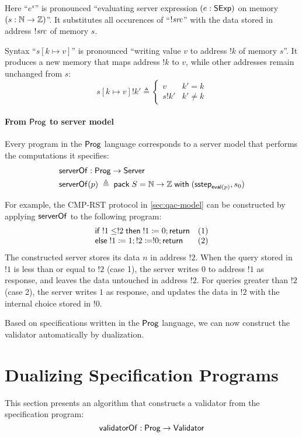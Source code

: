 Here ``$e^s$'' is pronounced ``evaluating server expression $(e:\mathsf{SExp})$ on
memory $(s:\mathbb N\to\mathbb Z)$''.  It substitutes all occurences of ``$!\mathit{src}$'' with
the data stored in address $!\mathit{src}$ of memory $s$.

Syntax ``$s[k\mapsto v]$'' is pronounced ``writing value $v$ to address $!k$ of
memory $s$''.  It produces a new memory that maps address $!k$ to $v$, while
other addresses remain unchanged from $s$:
\[s[k\mapsto v]!k'\triangleq\begin{cases}v&k'=k\\
s!k'&k'\neq k\end{cases}\]

\paragraph{From $\mathsf{Prog}$ to server model}
Every program in the $\mathsf{Prog}$ language corresponds to a server model that
performs the computations it specifies:
\begin{align*}
  &\mathsf{serverOf}:\mathsf{Prog}\to\mathsf{Server}\\
  &\mathsf{serverOf}(p)\;\triangleq\;\mathsf{pack}\;S=\mathbb N\to\mathbb Z\;\mathsf{with}\;(\mathsf{sstep}_{\mathsf{eval}(p)},s_0)
\end{align*}

For example, the CMP-RST protocol in \autoref{sec:qac-model} can be constructed
by applying $\mathsf{serverOf}$ to the following program:
\[\begin{array}{ll}
\mathsf{if}\; !1\le!2\;\mathsf{then}\; !1\coloneqq0;\mathsf{return}&(1)\\
\mathsf{else}\;!1\coloneqq1;!2\coloneqq!0;\mathsf{return}&(2)
\end{array}\]
The constructed server stores its data $n$ in address $!2$.  When the query
stored in $!1$ is less than or equal to $!2$ (case 1), the server writes $0$ to
address $!1$ as response, and leaves the data untouched in address $!2$.  For
queries greater than $!2$ (case 2), the server writes $1$ as response, and
updates the data in $!2$ with the internal choice stored in $!0$.

Based on specifications written in the $\mathsf{Prog}$ language, we can now construct
the validator automatically by dualization.

\section{Dualizing Specification Programs}
\label{sec:dualize-prog}
This section presents an algorithm that constructs a validator from the
specification program:
\[\mathsf{validatorOf}:\mathsf{Prog}\to\mathsf{Validator}\]


